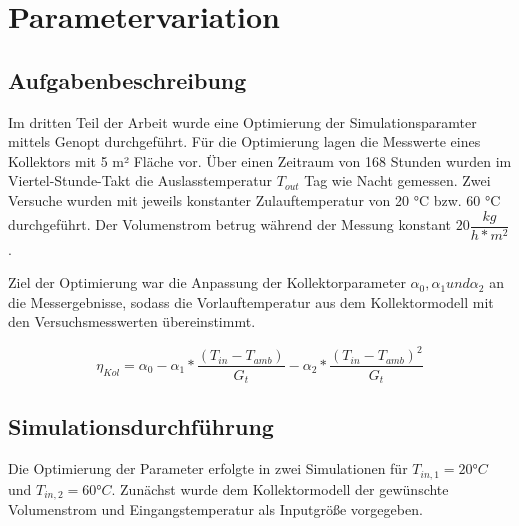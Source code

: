 \section{Parametervariation	}
\subsection{Aufgabenbeschreibung}

Im dritten Teil der Arbeit wurde eine Optimierung der Simulationsparamter mittels Genopt durchgeführt. Für die Optimierung lagen die Messwerte eines Kollektors mit 5 m² Fläche vor. Über einen Zeitraum von 168 Stunden wurden im Viertel-Stunde-Takt die Auslasstemperatur $T_{out}$ Tag wie Nacht gemessen. Zwei Versuche wurden mit jeweils konstanter Zulauftemperatur von 20 °C bzw. 60 °C durchgeführt. Der Volumenstrom betrug während der Messung konstant $20\dfrac{kg}{h*m^2}$.

Ziel der Optimierung war die Anpassung der Kollektorparameter  $\alpha_{0}, \alpha_{1} und \alpha_{2}$ an die Messergebnisse, sodass die Vorlauftemperatur aus dem Kollektormodell mit den Versuchsmesswerten übereinstimmt. 

\begin{equation}
	\label{eq:\eta}
	\eta_{Kol} = \alpha_{0}-\alpha_{1}*\frac{(T_{in}-T_{amb})}{G_{t}}-\alpha_{2}*\frac{(T_{in}-T_{amb})^2}{G_{t}}
\end{equation}

\subsection{Simulationsdurchführung}

Die Optimierung der Parameter erfolgte in zwei Simulationen für $T_{in,1} = 20 °C$ und $T_{in,2} = 60 °C$. Zunächst wurde dem Kollektormodell der gewünschte Volumenstrom und Eingangstemperatur als Inputgröße vorgegeben.